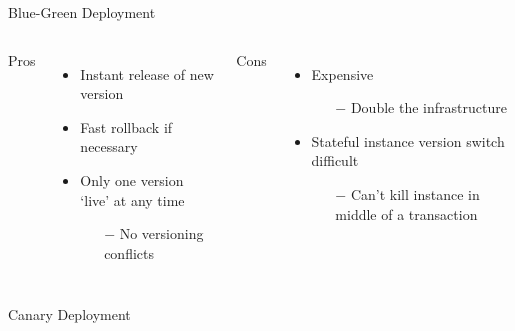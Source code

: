 \documentclass{slide}
\begin{document}
\begin{frame}{Blue-Green Deployment}
    \vspace{1pt}
    \begin{columns}[t]
      \huge Pros
      {\LARGE
        \begin{itemize}
            \item { Instant release of new version\\}
            \item Fast rollback if necessary
            \vspace{1mm}
            \item { Only one version `live' at any time\\}
            \begin{itemize}
                \Large\item[$-$] No versioning conflicts
            \end{itemize}
        \end{itemize}
      }
      \huge Cons
      {\LARGE
        \vspace{3mm}
        \begin{itemize}
            \item Expensive
            \begin{itemize}
                \Large\item[$-$] Double the infrastructure
            \end{itemize}
            \vspace{1mm}
            \item { Stateful instance version switch difficult\\}
            \begin{itemize}
                \Large\item[$-$] Can't kill instance in middle of a transaction
            \end{itemize}
        \end{itemize}
      }
    \end{columns}
\end{frame}

\begin{frame}{Canary Deployment \cite{deployment-strategies}}
    \vspace{1pt}
    \centering
\end{frame}
\end{document}
